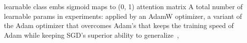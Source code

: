 learnable class embs
sigmoid maps to (0, 1)
attention matrix A
total number of learnable params
in experiments: applied by an AdamW optimizer, a variant of the Adam optimizer that overcomes Adam's that keeps the training speed of Adam while keeping SGD's superior ability to generalize~, \cite{Loshchilov2019DecoupledWD}
